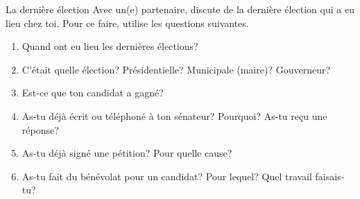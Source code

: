 \begin{frame}{La dernière élection}
  Avec un(e) partenaire, discute de \alert{la dernière élection} qui a eu lieu \alert{chez toi}.
  Pour ce faire, utilise les questions suivantes.
  \begin{enumerate}
    \item Quand ont eu lieu les dernières élections?
    \item C'était quelle élection? Présidentielle? Municipale (maire)? Gouverneur?
    \item Est-ce que ton candidat a gagné?
    \item As-tu déjà écrit ou téléphoné à ton sénateur? Pourquoi? As-tu reçu une réponse?
    \item As-tu déjà signé une pétition? Pour quelle cause?
    \item As-tu fait du bénévolat pour un candidat? Pour lequel? Quel travail faisais-tu?
  \end{enumerate}
\end{frame}